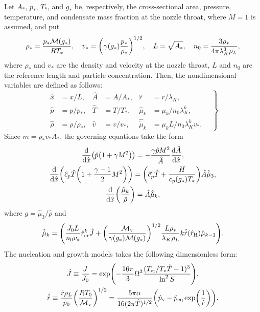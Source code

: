 \documentclass{article}
\newcommand{\vap}{\text{v}}
\newcommand{\eq}{\text{eq}}
\newcommand{\crit}[2][]{#2_\text{cr#1}}
\newcommand{\Hill}{\text{H}}
\begin{document}
Let $A_*$, $p_*$, $T_*$, and $g_*$ be, respectively, the cross-sectional area, pressure, temperature,
and condensate mass fraction at the nozzle throat, where $M=1$ is assumed, and put
\begin{equation}\label{eq:reference}
    \rho_* = \frac{p_*\mathcal{M}(g_*)}{RT_*}, \quad
    v_* = \qty(\gamma(g_*)\frac{p_*}{\rho_*})^{1/2}, \quad
    L = \sqrt{A_*}, \quad
    n_0 = \frac{3\rho_*}{4\pi\lambda_K^3\rho_L},
\end{equation}
where $\rho_*$ and $v_*$ are the density and velocity at the nozzle throat,
$L$ and $n_0$ are the reference length and particle concentration.
Then, the nondimensional variables are defined as follows:
\begin{equation}\label{eq:nondimensional}
    \left.\begin{aligned}
        \hat{x} &= x/L,             &\hat{A} &= A/A_*,  &\hat{r} &= r/\lambda_K, \\
        \hat{p} &= p/p_*,           &\hat{T} &= T/T_*,  &\hat{\mu}_k &= \mu_k/n_0\lambda_K^k, \\
        \hat{\rho} &= \rho/\rho_*,  &\hat{v} &= v/v_*,  &\hat{\dot{\mu}}_k &= \mu_kL/n_0\lambda_K^kv_*.
    \end{aligned}\quad\right\}
\end{equation}
Since $\dot{m} = \rho_*v_*A_*$, the governing equations take the form
\begin{gather}
    \dv{\hat{x}}(\hat{p}\qty(1 + \gamma M^2))
        = -\frac{\gamma \hat{p} M^2}{\hat{A}}\dv{\hat{A}}{\hat{x}}, \label{eq:momentum3}\\
    \dv{\hat{x}}(\hat{c}_p\hat{T}\qty(1 + \frac{\gamma-1}{2}M^2))
        = \qty(\hat{c}_p'\hat{T} + \frac{H}{c_p(g_*)T_*})\hat{A}\hat{\dot{\mu}}_3, \label{eq:energy3}\\
    \dv{\hat{x}}(\frac{\hat{\mu}_k}{\hat{\rho}}) = \hat{A}\hat{\dot{\mu}}_k, \label{eq:moments3}
\end{gather}
where $g = \hat{\mu}_3/\hat{\rho}$ and
\begin{equation}\label{eq:dot_mu_k}
    \hat{\dot{\mu}}_k = \qty( \frac{J_0L}{n_0v_*} \crit{\hat{r}}^{k}\hat{J}
        + \qty(\frac{\mathcal{M}_\vap}{\gamma(g_*)\mathcal{M}(g_*)})^{1/2}\frac{L\rho_*}{\lambda_K\rho_L}
            k\hat{\dot{r}}(\hat{r}_\Hill)\hat{\mu}_{k-1}).
\end{equation}
The nucleation and growth models takes the following dimensionless form:
\begin{gather}
    \hat{J} \equiv \frac{J}{J_0}
        = \exp(-\frac{16\pi}{3}\Omega^3\frac{(\crit{T}/T_*\hat{T}-1)^3}{\ln^2{S}}), \label{eq:nucleation3}\\
    \hat{\dot{r}} \equiv \frac{\dot{r}\rho_L}{p_0}\qty(\frac{RT_0}{\mathcal{M}_\vap})^{1/2}
        = \frac{5\pi\alpha}{16(2\pi\hat{T})^{1/2}}
            \qty(\hat{p}_\vap - \hat{p}_\eq\exp(\frac1{\hat{r}})). \label{eq:growth3}
\end{gather}
\end{document}
